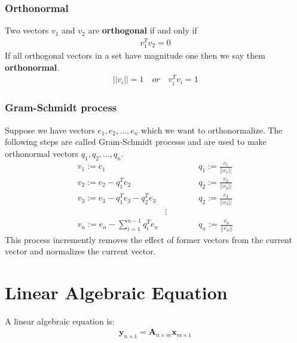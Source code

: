 \documentclass{article}
\begin{document}
\subsubsection{Orthonormal}
Two vectors \(v_1\) and \(v_2\) are \textbf{orthogonal} if and only if
\begin{align*}
v_1^Tv_2=0
\end{align*}
If all orthogonal vectors in a set have magnitude one then we say them \textbf{orthonormal}.
\begin{align*}
||v_i|| = 1 \quad or \quad v_i^Tv_i=1
\end{align*}

\subsubsection{Gram-Schmidt process}
Suppose we have vectors \(e_1, e_2, \dots ,e_n\) which we want to orthonormalize. The following steps are called Gram-Schmidt processs and are used to make orthonormal vectors \(q_1, q_2, \dots, q_n\).
\begin{align*}
v_1 := e_1 &\qquad \qquad q_1 := \frac{v_1}{||v_1||}\\
v_2 := e_2 - q_1^Te_2 &\qquad \qquad  q_2 := \frac{v_2}{||v_2||}\\
v_3 := e_3 - q_1^Te_3 - q_2^Te_3 &\qquad \qquad  q_2 := \frac{v_3}{||v_3||}\\
&\vdots\\
v_n := e_n - \sum_{i=1}^{n-1}q_i^Te_n &\qquad \qquad q_n := \frac{v_n}{||v_n||}
\end{align*}
This process incremently removes the effect of former vectors from the current vector and normalizes the current vector.
\section{Linear Algebraic Equation}
A linear algebraic equation is:
\begin{align} \label{eq: LAE}
\mathbf{y}_{n\times 1}=\mathbf{A}_{n \times m}\mathbf{x}_{m \times 1}
\end{align}
\end{document}
